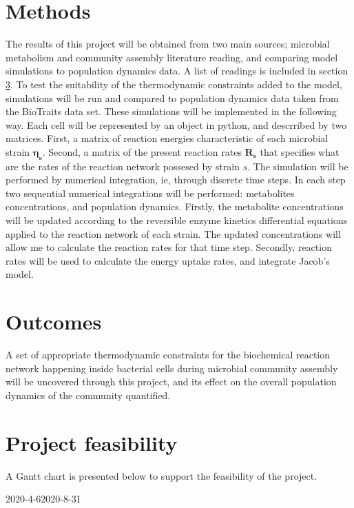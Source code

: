 \documentclass[titlepage,11pt]{article}
\begin{document}
\begin{linenumbers}
		\section{Methods}
		The results of this project will be obtained from two main sources; microbial metabolism and community assembly literature reading, and comparing model simulations to population dynamics data. A list of readings is included in section \ref{sec:feasibility}. To test the suitability of the thermodynamic constraints added to the model, simulations will be run and compared to population dynamics data taken from the BioTraits data set. These simulations will be implemented in the following way. Each cell will be represented by an object in python, and descrribed by two matrices. First, a matrix of reaction energies characteristic of each microbial strain $ \boldsymbol{\eta_s} $. Second, a matrix of the present reaction rates $ \boldsymbol{R_s} $ that specifies what are the rates of the reaction network possesed  by strain $ s $. The simulation will be performed by numerical integration, ie, through discrete time steps. In each step two sequential numerical integrations will be performed: metabolites concentrations, and population dynamics. Firstly, the metabolite concentrations will be updated according to the reversible enzyme kinetics differential equations applied to the reaction network of each strain. The updated concentrations will allow me to calculate the reaction rates for that time step. Secondly, reaction rates will be used to calculate the energy uptake rates, and integrate Jacob's model.
		\section{Outcomes}
		A set of appropriate thermodynamic constraints for the biochemical reaction network happening inside bacterial cells during microbial community assembly will be uncovered through this project, and its effect on the overall population dynamics of the community quantified.
		\section{Project feasibility}\label{sec:feasibility}
		A Gantt chart is presented below to support the feasibility of the project.
		\begin{center}
			
			\begin{ganttchart}[time slot format=isodate,
				x unit=0.08cm,
				hgrid]{2020-4-6}{2020-8-31} 
				 \\ 
				\\
				\\
				\\
				\\
			\end{ganttchart}\\
			

\end{center}
\end{linenumbers}
\end{document}
